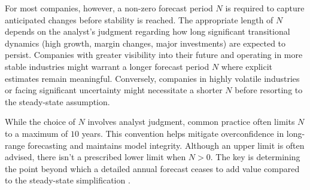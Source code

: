 For most companies, however, a non-zero forecast period \(N\) is required to capture anticipated changes before stability is reached. The appropriate length of \(N\) depends on the analyst's judgment regarding how long significant transitional dynamics (high growth, margin changes, major investments) are expected to persist. Companies with greater visibility into their future and operating in more stable industries might warrant a longer forecast period \(N\) where explicit estimates remain meaningful. Conversely, companies in highly volatile industries or facing significant uncertainty might necessitate a shorter \(N\) before resorting to the steady-state assumption.

While the choice of \(N\) involves analyst judgment, common practice often limits \(N\) to a maximum of \(10\) years. This convention helps mitigate overconfidence in long-range forecasting and maintains model integrity. Although an upper limit is often advised, there isn't a prescribed lower limit when \(N>0\). The key is determining the point beyond which a detailed annual forecast ceases to add value compared to the steady-state simplification \parencite{damodaran2025investment, koller2020valuation}.
